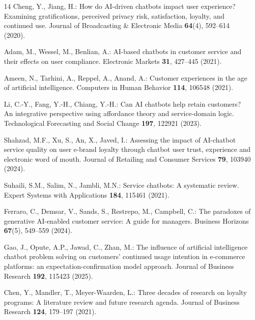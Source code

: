 \documentclass[runningheads]{llncs}
\begin{document}
%
%
\begin{thebibliography}{14}
Cheng, Y., Jiang, H.: How do AI-driven chatbots impact user experience? Examining gratifications, perceived privacy risk, satisfaction, loyalty, and continued use. Journal of Broadcasting \& Electronic Media \textbf{64}(4), 592--614 (2020). 

Adam, M., Wessel, M., Benlian, A.: AI-based chatbots in customer service and their effects on user compliance. Electronic Markets \textbf{31}, 427--445 (2021). 

Ameen, N., Tarhini, A., Reppel, A., Anand, A.: Customer experiences in the age of artificial intelligence. Computers in Human Behavior \textbf{114}, 106548 (2021). 

Li, C.-Y., Fang, Y.-H., Chiang, Y.-H.: Can AI chatbots help retain customers? An integrative perspective using affordance theory and service-domain logic. Technological Forecasting and Social Change \textbf{197}, 122921 (2023). 

Shahzad, M.F., Xu, S., An, X., Javed, I.: Assessing the impact of AI-chatbot service quality on user e-brand loyalty through chatbot user trust, experience and electronic word of mouth. Journal of Retailing and Consumer Services \textbf{79}, 103940 (2024). 

Suhaili, S.M., Salim, N., Jambli, M.N.: Service chatbots: A systematic review. Expert Systems with Applications \textbf{184}, 115461 (2021). 

Ferraro, C., Demsar, V., Sands, S., Restrepo, M., Campbell, C.: The paradoxes of generative AI-enabled customer service: A guide for managers. Business Horizons \textbf{67}(5), 549--559 (2024). 

Gao, J., Opute, A.P., Jawad, C., Zhan, M.: The influence of artificial intelligence chatbot problem solving on customers' continued usage intention in e-commerce platforms: an expectation-confirmation model approach. Journal of Business Research \textbf{192}, 115423 (2025). 

Chen, Y., Mandler, T., Meyer-Waarden, L.: Three decades of research on loyalty programs: A literature review and future research agenda. Journal of Business Research \textbf{124}, 179--197 (2021). 


\end{thebibliography}
\end{document}
